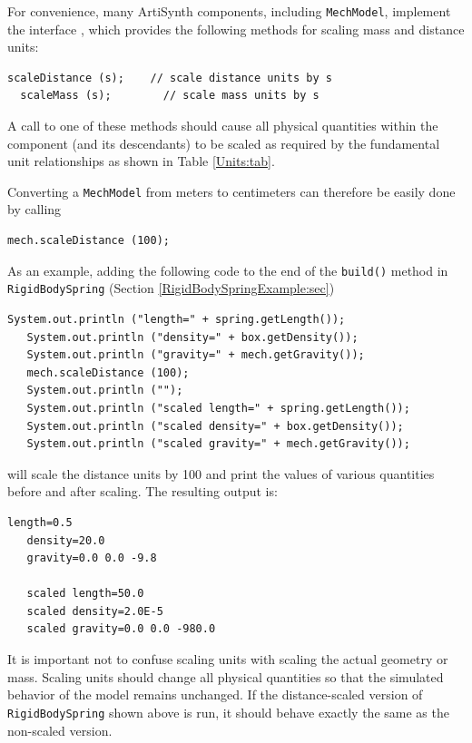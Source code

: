 For convenience, many ArtiSynth components, including {\tt MechModel},
implement the interface
, which
provides the following methods for scaling mass and distance units:
%
\begin{lstlisting}[]
  scaleDistance (s);    // scale distance units by s
  scaleMass (s);        // scale mass units by s
\end{lstlisting}
%
A call to one of these methods should cause all physical quantities
within the component (and its descendants) to be
scaled as required by the fundamental unit relationships
as shown in Table \ref{Units:tab}.

Converting a {\tt MechModel} from meters to centimeters can therefore be
easily done by calling 
%
\begin{lstlisting}[]
   mech.scaleDistance (100);
\end{lstlisting}
%
As an example, adding the following code to the end of the {\tt build()}
method in {\tt RigidBodySpring} (Section \ref{RigidBodySpringExample:sec})
%
\begin{lstlisting}[]
   System.out.println ("length=" + spring.getLength());
   System.out.println ("density=" + box.getDensity());
   System.out.println ("gravity=" + mech.getGravity());
   mech.scaleDistance (100);
   System.out.println ("");
   System.out.println ("scaled length=" + spring.getLength());
   System.out.println ("scaled density=" + box.getDensity());
   System.out.println ("scaled gravity=" + mech.getGravity());
\end{lstlisting}
%
will scale the distance units by 100 and print the values of various
quantities before and after scaling. The resulting output is:
%
\begin{lstlisting}[]
   length=0.5
   density=20.0
   gravity=0.0 0.0 -9.8

   scaled length=50.0
   scaled density=2.0E-5
   scaled gravity=0.0 0.0 -980.0
\end{lstlisting}
%

\begin{sideblock}
It is important not to confuse scaling units with scaling the actual
geometry or mass. Scaling units should change all physical
quantities so that the simulated behavior of the model remains
unchanged.  If the distance-scaled version of {\tt RigidBodySpring}
shown above is run, it should behave exactly the same as the
non-scaled version.
\end{sideblock}


